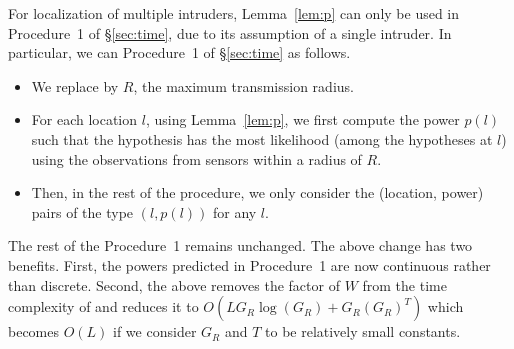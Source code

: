    For localization of
multiple intruders, Lemma~\ref{lem:p} can only be used in Procedure~1
of \S\ref{sec:time}, due to its assumption of a single intruder. In
particular, we can Procedure~1 of \S\ref{sec:time} as follows.
\begin{itemize}
\item
We replace \Rp by $R$, the maximum transmission radius.
  
\item
For each location $l$, using Lemma~\ref{lem:p}, we first compute the
power $p(l)$ such that the hypothesis \hlpl has the most likelihood
(among the hypotheses at $l$) using the observations from sensors
within a radius of $R$.
\item
Then, in the rest of the procedure, we only consider the (location,
power) pairs of the type $(l, p(l))$ for any $l$.
\end{itemize}
The rest of the Procedure~1 remains unchanged. The above change has two
benefits. First, the powers predicted in Procedure~1 are now
continuous rather than discrete. Second, the above removes the factor
of $W$ from the time complexity of \ouralgo and reduces it to
$O(LG_R\log(G_R) + G_R(G_R)^T)$ which becomes $O(L)$ if we consider
$G_R$ and $T$ to be relatively small constants.

